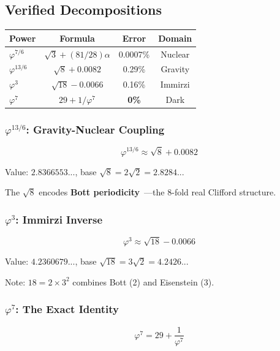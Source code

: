 \documentclass[aps,prd,twocolumn,superscriptaddress,floatfix,nofootinbib]{revtex4-2}
\theoremstyle{definition}
\theoremstyle{remark}
\newcommand{\vp}{\varphi}
\begin{document}
\subsection{Verified Decompositions}

\begin{center}
\begin{tabular}{lccc}
\toprule
Power & Formula & Error & Domain \\
\midrule
$\vp^{7/6}$ & $\sqrt{3} + (81/28)\alpha$ & 0.0007\% & Nuclear \\
$\vp^{13/6}$ & $\sqrt{8} + 0.0082$ & 0.29\% & Gravity \\
$\vp^3$ & $\sqrt{18} - 0.0066$ & 0.16\% & Immirzi \\
$\vp^7$ & $29 + 1/\vp^7$ & \textbf{0\%} & Dark \\
\bottomrule
\end{tabular}
\end{center}

\subsubsection{$\vp^{13/6}$: Gravity-Nuclear Coupling}

\begin{equation}
\vp^{13/6} \approx \sqrt{8} + 0.0082
\end{equation}

Value: $2.8366553...$, base $\sqrt{8} = 2\sqrt{2} = 2.8284...$

The $\sqrt{8}$ encodes \textbf{Bott periodicity}~\cite{bott}---the 8-fold real Clifford structure.

\subsubsection{$\vp^3$: Immirzi Inverse}

\begin{equation}
\vp^3 \approx \sqrt{18} - 0.0066
\end{equation}

Value: $4.2360679...$, base $\sqrt{18} = 3\sqrt{2} = 4.2426...$

Note: $18 = 2 \times 3^2$ combines Bott (2) and Eisenstein (3).

\subsubsection{$\vp^7$: The Exact Identity}

\begin{equation}
\vp^7 = 29 + \frac{1}{\vp^7}
\end{equation}
\end{document}
